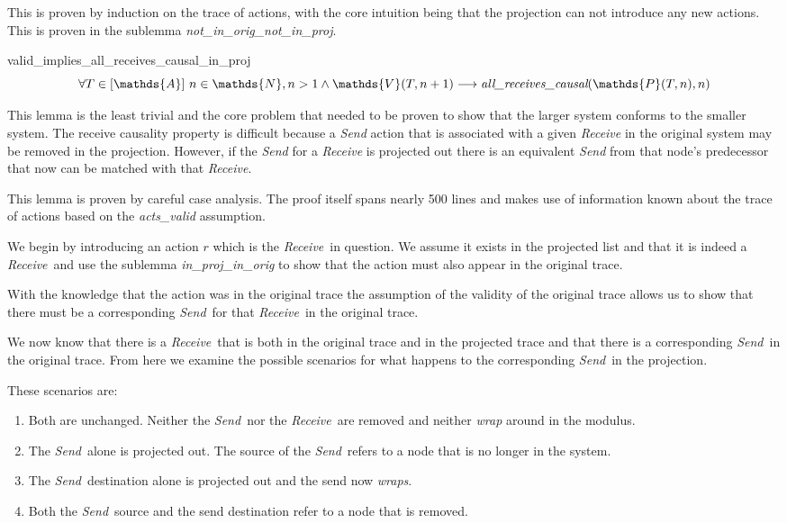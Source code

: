 \documentclass[runningheads]{llncs}
\newcommand{\send}{\emph{Send}}
\newcommand{\receive}{\emph{Receive}}
\newcommand{\action}{\mathds{A}}
\newcommand{\listaction}{[\action]}
\newcommand{\actsvalid}[2]{\mathds{V}(#1, #2)}
\newcommand{\projectsize}[2]{\mathds{P}(#1, #2)}
\newcommand{\allrc}[2]{\emph{all\_receives\_causal}(#1, #2)}
\begin{document}
This is proven by induction on the trace of actions, with the core intuition being that the projection can not introduce any new actions. This is proven in the sublemma \emph{not\_in\_orig\_not\_in\_proj}. 


\begin{lemma}{valid\_implies\_all\_receives\_causal\_in\_proj}
$$ \forall T \in \listaction\ n \in \mathds{N}, n > 1 \wedge \actsvalid{T}{n+1} \longrightarrow \allrc{\projectsize{T}{n}}{n} $$
\end{lemma}
This lemma is the least trivial and the core problem that needed to be proven to show that the larger system conforms to the smaller system. The receive causality property is difficult because a \emph{Send} action that is associated with a given \emph{Receive} in the original system may be removed in the projection. However, if the \emph{Send} for a \emph{Receive} is projected out there is an equivalent \emph{Send} from that node's predecessor that now can be matched with that \emph{Receive}. 

This lemma is proven by careful case analysis. The proof itself spans nearly 500 lines and makes use of information known about the trace of actions based on the \emph{acts\_valid} assumption. 

We begin by introducing an action $r$ which is the \receive\ in question. We assume it exists in the projected list and that it is indeed a \receive\ and use the sublemma \emph{in\_proj\_in\_orig} to show that the action must also appear in the original trace. 

With the knowledge that the action was in the original trace the assumption of the validity of the original trace allows us to show that there must be a corresponding \send\ for that \receive\ in the original trace. 

We now know that there is a \receive\ that is both in the original trace and in the projected trace and that there is a corresponding \send\ in the original trace. From here we examine the possible scenarios for what happens to the corresponding \send\ in the projection.

These scenarios are:
\begin{enumerate}
\item \label{case:normal} Both are unchanged. Neither the \send\ nor the \receive\ are removed and neither \emph{wrap} around in the modulus.
\item \label{case:src_wrap} The \send\ alone is projected out. The source of the \send\ refers to a node that is no longer in the system.
\item \label{case:dest_wrap} The \send\ destination alone is projected out and the send now \emph{wraps}.
\item \label{case:both_wrap} Both the \send\ source and the send destination refer to a node that is removed. 
\end{enumerate}
\end{document}
